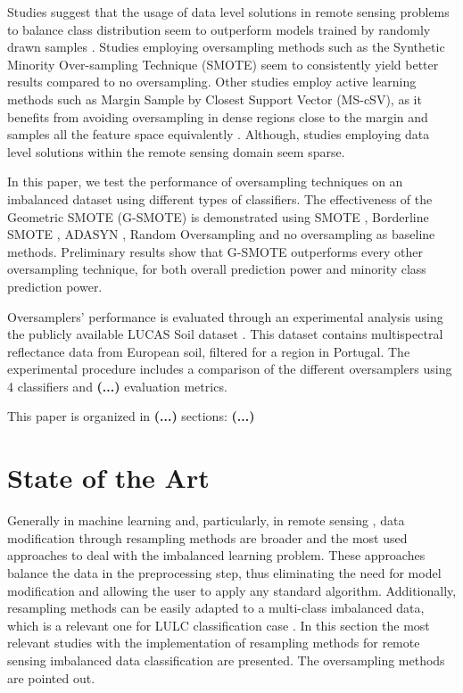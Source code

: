 \documentclass[parskip=full]{scrartcl}
\begin{document}
Studies suggest that the usage of data level solutions in remote sensing
problems to balance class distribution seem to outperform models
trained by randomly drawn samples \cite{Wang2019, Mellor2015}.  Studies
employing oversampling methods such as the Synthetic Minority Over-sampling
Technique (SMOTE) \cite{Chawla2002} seem to consistently yield better results
\cite{Johnson2013, Geib2015} compared to no oversampling. Other studies employ
active learning methods such as Margin Sample by Closest Support Vector
(MS-cSV), as it benefits from avoiding oversampling in dense regions close to
the margin and samples all the feature space equivalently \cite{Tuia2009}.
Although, studies employing data level solutions within the remote sensing
domain seem sparse.

In this paper, we test the performance of oversampling techniques on an
imbalanced dataset using different types of classifiers. The effectiveness of
the Geometric SMOTE (G-SMOTE) \cite{Douzas2019} is demonstrated using SMOTE
\cite{Chawla2002}, Borderline SMOTE \cite{Han2005}, ADASYN \cite{HaiboHe2008},
Random Oversampling and no oversampling as baseline methods. Preliminary results
show that G-SMOTE outperforms every other oversampling technique, for both
overall prediction power and minority class prediction power.

Oversamplers' performance is evaluated through an experimental analysis using
the publicly available LUCAS Soil dataset \cite{Toth2013}. This dataset contains
multispectral reflectance data from European soil, filtered for a region in
Portugal. The experimental procedure includes a comparison of the different
oversamplers using 4 classifiers and \textbf{(...)} evaluation metrics.

This paper is organized in \textbf{(...)} sections: \textbf{(...)}

\section{State of the Art}

Generally in machine learning \cite{Douzas2019} and, particularly, in 
remote sensing \cite{Feng2019}, data modification through resampling methods 
are broader and the most used approaches to deal with the imbalanced learning 
problem. These approaches balance the data in the preprocessing step, thus 
eliminating the need for model modification and allowing the user to apply any 
standard algorithm. Additionally, resampling methods can be easily adapted to a 
multi-class imbalanced data, which is a relevant one for LULC classification 
case \cite{Feng2019}. In this section the most relevant studies with the 
implementation of resampling methods for remote sensing imbalanced data 
classification are presented. The oversampling methods are pointed out.
\end{document}
